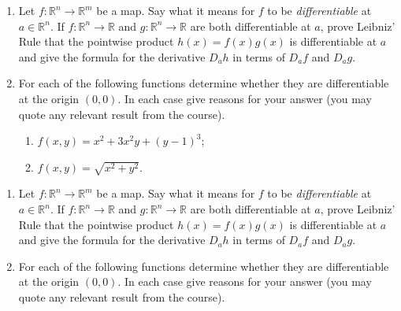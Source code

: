 \documentclass{exams}
\newcommand{\R}{\mathbb{R}}
\begin{document}
\begin{exam}



\begin{question}
\begin{enumerate}
\item Let $f \colon \R^n \to \R^m$ be a map. Say what it means for $f$ to be
\textit{differentiable} at $a \in \R^n$. If $f \colon \R^n \to \R$ and
$g \colon \R^n \to \R$ are both differentiable at $a$, prove Leibniz'
Rule that the pointwise product $h(x) = f(x)g(x)$ is differentiable at
$a$ and give the formula for the derivative $D_ah$ in terms of $D_af$
and $D_ag$.

\item For each of the following functions determine whether they are
differentiable at the origin $(0,0)$. In each case give reasons for your
answer (you may quote any relevant result from the course).

\begin{enumerate}
\item $f(x,y) = x^2 + 3x^2y + (y-1)^3$;
\item $f(x,y) = \sqrt{x^2+y^2}$.
\end{enumerate}
\end{enumerate}
\end{question}

\newpage

\begin{question}
\begin{enumerate}
\item Let $f \colon \R^n \to \R^m$ be a map. Say what it means for $f$ to be
\textit{differentiable} at $a \in \R^n$. If $f \colon \R^n \to \R$ and
$g \colon \R^n \to \R$ are both differentiable at $a$, prove Leibniz'
Rule that the pointwise product $h(x) = f(x)g(x)$ is differentiable at
$a$ and give the formula for the derivative $D_ah$ in terms of $D_af$
and $D_ag$.

\item For each of the following functions determine whether they are
differentiable at the origin $(0,0)$. In each case give reasons for your
answer (you may quote any relevant result from the course).


\end{enumerate}
\end{question}
\end{exam}
\end{document}
